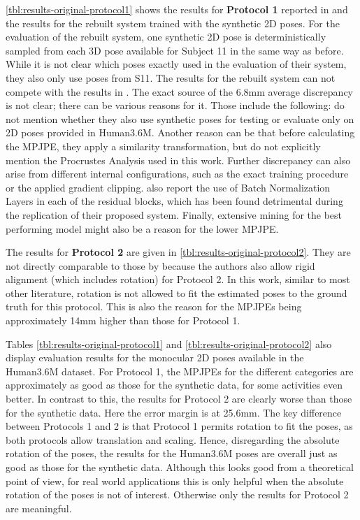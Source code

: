 \autoref{tbl:results-original-protocol1} shows the results for \textbf{Protocol 1} reported in \cite{drover18} and the results for the rebuilt system trained with the synthetic 2D poses.
For the evaluation of the rebuilt system, one synthetic 2D pose is deterministically sampled from each 3D pose available for Subject 11 in the same way as before.
While it is not clear which poses \citet{drover18} exactly used in the evaluation of their system, they also only use poses from S11.
The results for the rebuilt system can not compete with the results in \cite{drover18}.
The exact source of the 6.8mm average discrepancy is not clear; there can be various reasons for it.
Those include the following:
\citet{drover18} do not mention whether they also use synthetic poses for testing or evaluate only on 2D poses provided in Human3.6M.
Another reason can be that before calculating the MPJPE, they apply a similarity transformation, but do not explicitly mention the Procrustes Analysis used in this work.
Further discrepancy can also arise from different internal configurations, such as the exact training procedure or the applied gradient clipping.
\citet{drover18} also report the use of Batch Normalization Layers in each of the residual blocks, which has been found detrimental during the replication of their proposed system.
Finally, extensive mining for the best performing model might also be a reason for the lower MPJPE.

The results for \textbf{Protocol 2} are given in \autoref{tbl:results-original-protocol2}.
They are not directly comparable to those by \citet{drover18} because the authors also allow rigid alignment (which includes rotation) for Protocol 2.
In this work, similar to most other literature, rotation is not allowed to fit the estimated poses to the ground truth for this protocol.
This is also the reason for the MPJPEs being approximately 14mm higher than those for Protocol 1.

Tables \ref{tbl:results-original-protocol1} and \ref{tbl:results-original-protocol2} also display evaluation results for the monocular 2D poses available in the Human3.6M dataset.
For Protocol 1, the MPJPEs for the different categories are approximately as good as those for the synthetic data, for some activities even better.
In contrast to this, the results for Protocol 2 are clearly worse than those for the synthetic data.
Here the error margin is at 25.6mm.
The key difference between Protocols 1 and 2 is that Protocol 1 permits rotation to fit the poses, as both protocols allow translation and scaling.
Hence, disregarding the absolute rotation of the poses, the results for the Human3.6M poses are overall just as good as those for the synthetic data.
Although this looks good from a theoretical point of view, for real world applications this is only helpful when the absolute rotation of the poses is not of interest.
Otherwise only the results for Protocol 2 are meaningful.

